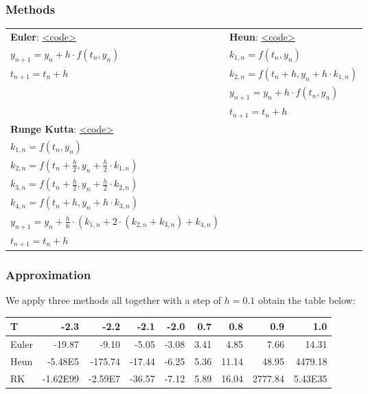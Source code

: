\documentclass[11pt,a4paper]{article}
\begin{document}
\subsubsection{Methods}
\begin{table}[H]
	\begin{center}
		\scriptsize
		\renewcommand{\arraystretch}{1.3} %
		\begin{tabular}{p{8cm}|p{8cm}}
			\textbf{Euler}: \hyperref[Euler]{<code>}		& \quad\textbf{Heun}: \hyperref[Heun]{<code>}				\\
			$y_{n+1} = y_n+h \cdot f(t_n, y_n)$	& \quad$ k_{1,n} = f(t_n,y_n)$				\\
			$ t_{n+1} = t_n+h$				& \quad$ k_{2,n} = f(t_n+h, y_n+h \cdot k_{1,n})$	\\
											& \quad$ y_{n+1} = y_n+h \cdot f(t_n, y_n)$		\\
											& \quad$ t_{n+1} = t_n+h$					\\
										 	
			
			\textbf{Runge Kutta}: \hyperref[Runge Kutta]{<code>}										&					\\
			$ k_{1,n} = f(t_n,y_n)$												&					\\
			$ k_{2,n} = f(t_n+\frac{h}{2}, y_n+\frac{h}{2} \cdot k_{1,n})$			&					\\
			$ k_{3,n} = f(t_n+\frac{h}{2}, y_n+\frac{h}{2} \cdot k_{2,n})$			&					\\
			$ k_{4,n} = f(t_n+h, y_n+h \cdot k_{3,n})$								&					\\
			$ y_{n+1} = y_n+\frac{h}{6} \cdot (k_{1,n}+2 \cdot (k_{2,n}+k_{3,n})+k_{4,n})$	&					\\
			$ t_{n+1} = t_n+h$													&					\\
		\end{tabular}
	\end{center}
\end{table}

\subsubsection{Approximation}
We apply three methods all together with a step of $h = 0.1$ obtain the table below:
\begin{table}[H]
	\begin{center}
		\scriptsize
		\renewcommand{\arraystretch}{1.2} %
		\begin{tabular}{l|r|r|r|r|r|r|r|r}
			\textbf{T}	&\textbf{-2.3}	&\textbf{-2.2}	&\textbf{-2.1}	&\textbf{-2.0}	&\textbf{0.7}	&\textbf{0.8}	&\textbf{0.9}	&\textbf{1.0}	\\
			\hline
			Euler		&-19.87			&-9.10			&-5.05			&-3.08			&3.41			&4.85			&7.66			&14.31			\\	
			\hline
			Heun		&-5.48E5		&-175.74		&-17.44			&-6.25			&5.36			&11.14			&48.95			&4479.18		\\
			\hline
			RK			&-1.62E99		&-2.59E7		&-36.57			&-7.12			&5.89			&16.04			&2777.84		&5.43E35		\\
		\end{tabular}
	\end{center}
\end{table}
\end{document}
